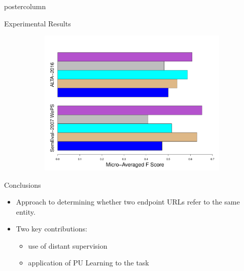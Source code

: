 \documentclass{beamer}
\begin{document}
\begin{frame}
\begin{columns}
\begin{column}{.5\textwidth}
\begin{beamercolorbox}[center]{postercolumn}
\begin{minipage}{.98\textwidth}
{\begin{block}{Experimental Results}
\begin{figure}
        \begin{figure}
							\begin{minipage}{1.22\textwidth}
								\centering\includegraphics[height=0.4\textwidth,width=1.25\textwidth,keepaspectratio]{img/ResultsWWW8.pdf}
							\end{minipage}
						\end{figure}
              \end{figure}
  
            \end{block}
         
            \begin{block}{Conclusions}
              \begin{itemize}
              \item Approach to determining whether two endpoint URLs refer to the same entity.
              \item Two key contributions:
                \begin{itemize}
                \item  use of distant supervision
                \item  application of PU Learning to the task
                \end{itemize}
              \end{itemize}
	\vspace{0.5em}
            \end{block}
		}\end{minipage}\end{beamercolorbox}
	\end{column}
\end{columns}
\end{frame}
\end{document}
